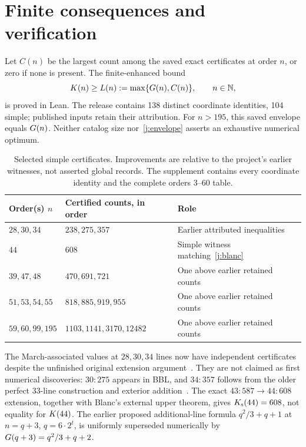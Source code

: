 \section{Finite consequences and verification}\label{j:verification}

Let $C(n)$ be the largest count among the saved exact certificates at order $n$, or zero if none is present. The finite-enhanced bound
\begin{equation}\label{j:envelope}
 K(n)\ge L(n):=\max\{G(n),C(n)\},\qquad n\in\mathbb N,
\end{equation}
is proved in Lean. The release contains 138 distinct coordinate identities, 104 simple; published inputs retain their attribution. For $n>195$, this saved envelope equals $G(n)$. Neither catalog size nor~\eqref{j:envelope} asserts an exhaustive numerical optimum.

\begin{table}[tb]
\centering\small
\begin{tabular}{@{}llp{.35\linewidth}@{}}
\toprule
Order(s) $n$ & Certified counts, in order & Role\\
\midrule
$28,30,34$ & $238,275,357$ & Earlier attributed inequalities\\
$44$ & $608$ & Simple witness matching~\eqref{j:blanc}\\
$39,47,48$ & $470,691,721$ & One above earlier retained counts\\
$51,53,54,55$ & $818,885,919,955$ & One above earlier retained counts\\
$59,60,99,195$ & $1103,1141,3170,12482$ & One above earlier retained counts\\
\bottomrule
\end{tabular}
\caption{Selected simple certificates. Improvements are relative to the project's earlier witnesses, not asserted global records. The supplement contains every coordinate identity and the complete orders 3--60 table.}\label{j:finite}
\end{table}

The March-associated values at $28,30,34$ lines now have independent certificates despite the unfinished original extension argument~\cite{zarzuelo2026,oeisA006066}. They are not claimed as first numerical discoveries: $30:275$ appears in BBL, and $34:357$ follows from the older perfect 33-line construction and exterior addition~\cite{bbl2008,forge1998}. The exact $43:587\to44:608$ extension, together with Blanc's external upper theorem, gives $K_{\mathrm s}(44)=608$, not equality for $K(44)$. The earlier proposed additional-line formula $q^2/3+q+1$ at $n=q+3$, $q=6\cdot2^t$, is uniformly superseded numerically by $G(q+3)=q^2/3+q+2$.


